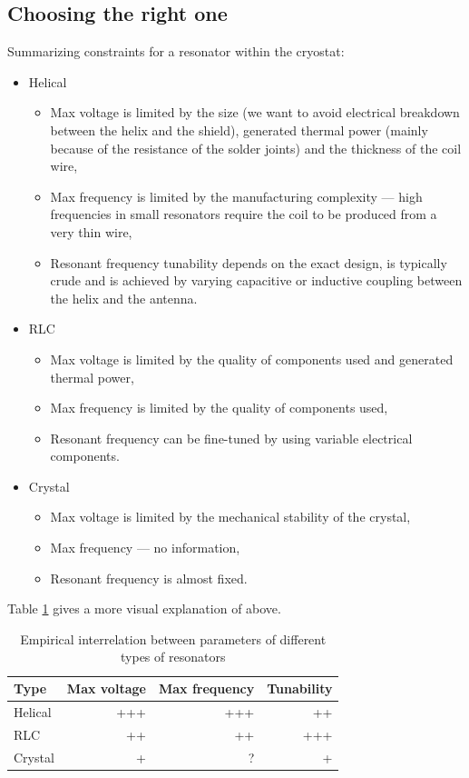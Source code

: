 \subsection{Choosing the right one}
Summarizing constraints for a resonator within the cryostat:
\begin{itemize}
	\item Helical
	\begin{itemize}
		\item Max voltage is limited by the size (we want to avoid electrical breakdown between the helix and the shield), generated thermal power (mainly because of the resistance of the solder joints) and the thickness of the coil wire,
		\item Max frequency is limited by the manufacturing complexity --- high frequencies in small resonators require the coil to be produced from a very thin wire,  
		\item Resonant frequency tunability depends on the exact design, is typically crude and is achieved by varying capacitive or inductive coupling between the helix and the antenna. 
	\end{itemize}
	\item RLC
	\begin{itemize}
		\item Max voltage is limited by the quality of components used and generated thermal power,
		\item Max frequency is limited by the quality of components used,  
		\item Resonant frequency can be fine-tuned by using variable electrical components.  
	\end{itemize}
	\item Crystal
	\begin{itemize}
		\item Max voltage is limited by the mechanical stability of the crystal,
		\item Max frequency --- no information,  
		\item Resonant frequency is almost fixed.  
	\end{itemize}
\end{itemize}

Table \ref{tbl:compare_resonators} gives a more visual explanation of above.
\begin{table}[h]
\centering
\begin{tabular}{| l | r | r | r |}
	\hline
	Type & Max voltage & Max frequency & Tunability \\
	\hline \hline
	Helical & +++ & +++ & ++ \\
	\hline
	RLC & ++ & ++ & +++ \\
	\hline
	Crystal & + & ? & + \\
	\hline
\end{tabular}
\caption{Empirical interrelation between parameters of different types of resonators}
\label{tbl:compare_resonators}
\end{table}

